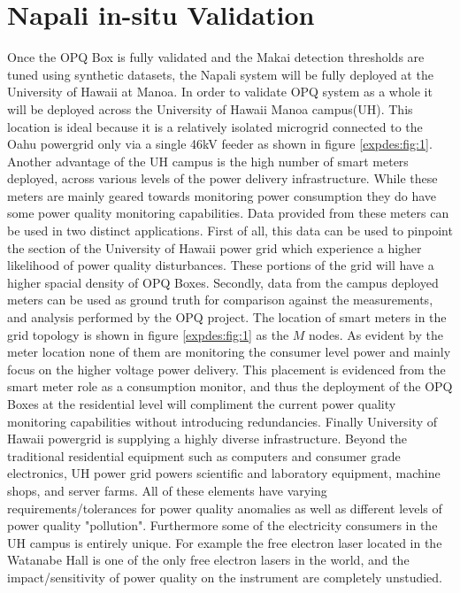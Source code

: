 \section{Napali in-situ Validation}
Once the OPQ Box is fully validated and the Makai detection thresholds are tuned using synthetic datasets, the Napali system will be fully deployed at the University of Hawaii at Manoa. In order to validate OPQ system as a whole it will be deployed across the University of Hawaii Manoa campus(UH). This location is ideal because it is a relatively isolated microgrid connected to the Oahu powergrid only via a single 46kV feeder as shown in figure \ref{expdes:fig:1}. Another advantage of the UH campus is the high number of smart meters deployed, across various levels of the power delivery infrastructure. While these meters are mainly geared towards monitoring power consumption they do have some power quality monitoring capabilities. Data provided from these meters can be used in two distinct applications. First of all, this data can be used to pinpoint the section of the University of Hawaii power grid which experience a higher likelihood of power quality disturbances. These portions of the grid will have a higher spacial density of OPQ Boxes. Secondly, data from the campus deployed meters can be used as ground truth for comparison against the measurements, and analysis performed by the OPQ project. The location of smart meters in the grid topology is shown in figure \ref{expdes:fig:1} as the $M$ nodes. As evident by the meter location none of them are monitoring the consumer level power and mainly focus on the higher voltage power delivery. This placement is evidenced from the smart meter role as a consumption monitor, and thus the deployment of the OPQ Boxes at the residential level will compliment the current power quality monitoring capabilities without introducing redundancies. Finally University of Hawaii powergrid is supplying a highly diverse infrastructure. Beyond the traditional residential equipment such as computers and consumer grade electronics, UH power grid powers scientific and laboratory equipment, machine shops, and server farms. All of these elements have varying requirements/tolerances for power quality anomalies as well as different levels of power quality "pollution". Furthermore some of the electricity consumers in the UH campus is entirely unique. For example the free electron laser located in the Watanabe Hall is one of the only free electron lasers in the world, and the impact/sensitivity of power quality on the instrument are completely unstudied.
